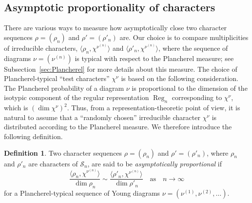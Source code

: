 \documentclass[12pt]%
{amsart}
\renewcommand\S{{\mathcal S}}
\DeclareMathOperator\Reg{Reg}
\newcommand{\la}{{\lambda}}
\theoremstyle{plain}
\theoremstyle{definition}
\newtheorem{definition}[theorem]{Definition}
\theoremstyle{remark}
\begin{document}


\subsection{Asymptotic proportionality of characters}\label{sec:tendtoregular}


There are various ways to measure how asymptotically close two character sequences $\rho = (\rho_n)$ and $\rho' = (\rho'_n)$ are.
Our choice is
to compare multiplicities 
of irreducible characters,
$\langle \rho_n,\chi^{\nu^{(n)}} \rangle$ and $\langle \rho'_n,\chi^{\nu^{(n)}} \rangle$,
where the sequence of diagrams $\nu = (\nu^{(n)})$ is typical with respect to the Plancherel measure; see Subsection~\ref{sec:Plancherel} for more details about this measure. 
%
%
The choice of Plancherel-typical ``test characters'' $\chi^\nu$ is based on the following consideration.
The Plancherel probability of a 
diagram $\nu$ is proportional to the dimension of the isotypic component of the regular representation $\Reg_n$ corresponding to $\chi^\nu$, which is $(\dim \chi^\nu)^2$. Thus, from a representation-theoretic point of view, it is natural to assume that a ``randomly chosen'' irreducible character $\chi^{\nu}$ is distributed according to the Plancherel measure.
We therefore introduce the following definition.

\begin{definition}
    Two character sequences $\rho = (\rho_n)$ and $\rho' = (\rho'_n)$, where $\rho_n$ and $\rho'_n$ are characters of $\S_n$, are said to be {\em asymptotically proportional} if 
    \begin{equation*}
        \frac{\langle \rho_n,\chi^{\nu^{(n)}} \rangle}{\dim\rho_n}
        \sim \frac{\langle \rho'_n,\chi^{\nu^{(n)}} \rangle}{\dim\rho'_n}
        \quad \text{as} \quad n\to\infty
    \end{equation*}
    for a Plancherel-typical sequence of Young diagrams $\nu=(\nu^{(1)},\nu^{(2)},\ldots)$.
\end{definition}
\end{document}
